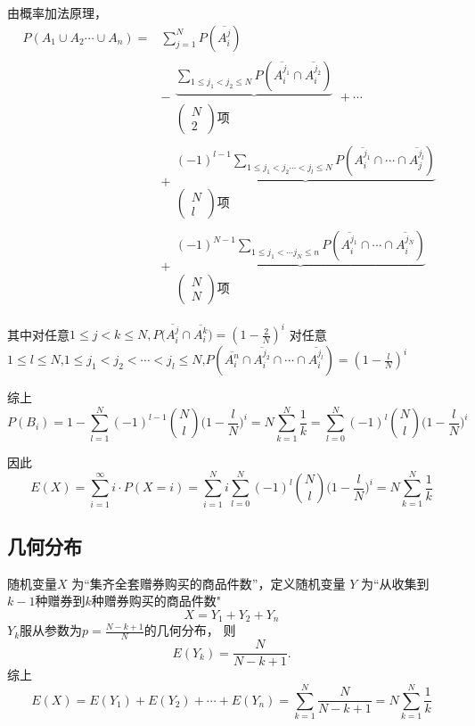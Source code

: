\documentclass[10t, a4paper, oneside]{ctexbook}
\begin{document}
由概率加法原理，
$$\begin{aligned}P(A_1\cup A_2 \cdots \cup A_n) =& \sum_{j = 1}^N P(\overline{A_i^j})\\
&-\begin{matrix}\underbrace{ \sum_{1 \le j_1 < j_2 \le N}P(\overline{A_i^{j_1}} \cap \overline{A_i^{j_2}})}\\
    \begin{pmatrix}N\\2\end{pmatrix}\text{项}
\end{matrix}+\cdots \\
&+\begin{matrix}\underbrace{ (-1)^{l-1}\sum_{1 \le j_1 < j_2 \cdots < j_l\le N}P(\overline{A_i^{j_1}} \cap\cdots\cap \overline{A_j^{j_l}})}\\
    \begin{pmatrix}N\\l\end{pmatrix}\text{项}
\end{matrix}\\
&+\begin{matrix}\underbrace{(-1)^{N-1}\sum_{1 \le j_1<\cdots j_N\le n}P(\overline{A_i^{j_1}} \cap\cdots\cap \overline{A_i^{j_N}})}\\
    \begin{pmatrix}N\\N\end{pmatrix}\text{项}
\end{matrix}\end{aligned}$$

其中对任意$1\leq j<k\leq N,P\Big(\overline{A_{i}^{j}}\cap\overline{A_{i}^{k}}\Big)=\left(1-\frac{2}{N}\right)^{i}$
对任意 $1\leq l\leq N\text{,}1\leq j_1<j_2<\cdots<j_l\leq N\text{,}P\left(\overline{A_i^n}\cap\overline{A_i^{j_2}}\cap\cdots\cap\overline{A_i^{j_l}}\right)=\left(1-\frac lN\right)^i$

综上$$P(B_i) = 1 - \sum_{l=1}^N(-1)^{l-1}\binom{N}{l}\biggl(1-\frac{l}{N}\biggr)^i=N\sum_{k=1}^N\frac{1}{k} = \sum_{l=0}^N(-1)^l\binom{N}{l}\biggl(1-\frac{l}{N}\biggr)^i$$

因此$$E(X) = \sum_{i = 1}^{\infty} i \cdot P(X = i) =\sum_{i=1}^Ni\sum_{l=0}^N(-1)^l\binom{N}{l}\biggl(1-\frac{l}{N}\biggr)^i=N\sum_{k=1}^N\frac{1}{k}$$
\subsection{几何分布}
随机变量$X$ 为“集齐全套赠券购买的商品件数”，定义随机变量 $Y$ 为“从收集到 $k-1$种赠券到$k$种赠券购买的商品件数"
$$X = Y_1 + Y_2 +Y_n$$
$Y_k$服从参数为$p = \frac{N-k+1}{N}$的几何分布， 则$$E(Y_k) = \frac{N}{N-k+1}.$$
综上
$$E\left(X\right)=E\left(Y_1\right)+E\left(Y_2\right)+\cdots+E\left(Y_n\right)=\sum_{k=1}^{N}\frac{N}{N-k+1}=N\sum_{k=1}^{N}\frac{1}{k}$$
\end{document}
